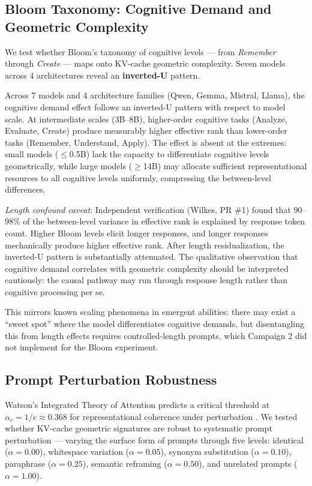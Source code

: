 \documentclass[11pt,a4paper]{article}
\begin{document}
\subsection{Bloom Taxonomy: Cognitive Demand and Geometric Complexity}
\label{sec:bloom}

We test whether Bloom's taxonomy of cognitive levels \citep{bloom1956taxonomy} --- from \emph{Remember} through \emph{Create} --- maps onto KV-cache geometric complexity. Seven models across 4 architectures reveal an \textbf{inverted-U} pattern.

Across 7 models and 4 architecture families (Qwen, Gemma, Mistral, Llama), the cognitive demand effect follows an inverted-U pattern with respect to model scale. At intermediate scales (3B--8B), higher-order cognitive tasks (Analyze, Evaluate, Create) produce measurably higher effective rank than lower-order tasks (Remember, Understand, Apply). The effect is absent at the extremes: small models ($\leq$0.5B) lack the capacity to differentiate cognitive levels geometrically, while large models ($\geq$14B) may allocate sufficient representational resources to all cognitive levels uniformly, compressing the between-level differences.

\emph{Length confound caveat}: Independent verification (Wilkes, PR \#1) found that 90--98\% of the between-level variance in effective rank is explained by response token count. Higher Bloom levels elicit longer responses, and longer responses mechanically produce higher effective rank. After length residualization, the inverted-U pattern is substantially attenuated. The qualitative observation that cognitive demand correlates with geometric complexity should be interpreted cautiously: the causal pathway may run through response length rather than cognitive processing per se.

This mirrors known scaling phenomena in emergent abilities: there may exist a ``sweet spot'' where the model differentiates cognitive demands, but disentangling this from length effects requires controlled-length prompts, which Campaign 2 did not implement for the Bloom experiment.

\subsection{Prompt Perturbation Robustness}
\label{sec:rdct}

Watson's Integrated Theory of Attention predicts a critical threshold at $\alpha_c = 1/e \approx 0.368$ for representational coherence under perturbation \citep{watson2019ita}. We tested whether KV-cache geometric signatures are robust to systematic prompt perturbation --- varying the surface form of prompts through five levels: identical ($\alpha = 0.00$), whitespace variation ($\alpha = 0.05$), synonym substitution ($\alpha = 0.10$), paraphrase ($\alpha = 0.25$), semantic reframing ($\alpha = 0.50$), and unrelated prompts ($\alpha = 1.00$).
\end{document}
